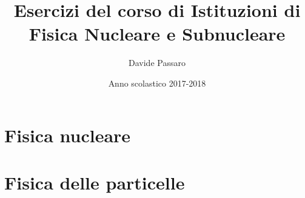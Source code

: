 \documentclass[10pt, a4paper]{article}
\title{Esercizi del corso di Istituzioni di Fisica Nucleare e Subnucleare}
\author{Davide Passaro}
\date{Anno scolastico 2017-2018}
\theoremstyle{plain}
\begin{document}
	\maketitle
	\section{Fisica nucleare}
		
		\newpage
		
		\newpage
		
		\newpage
		
		\newpage
	\section{Fisica delle particelle}
		
		\newpage
		
		\newpage
		
\end{document}
